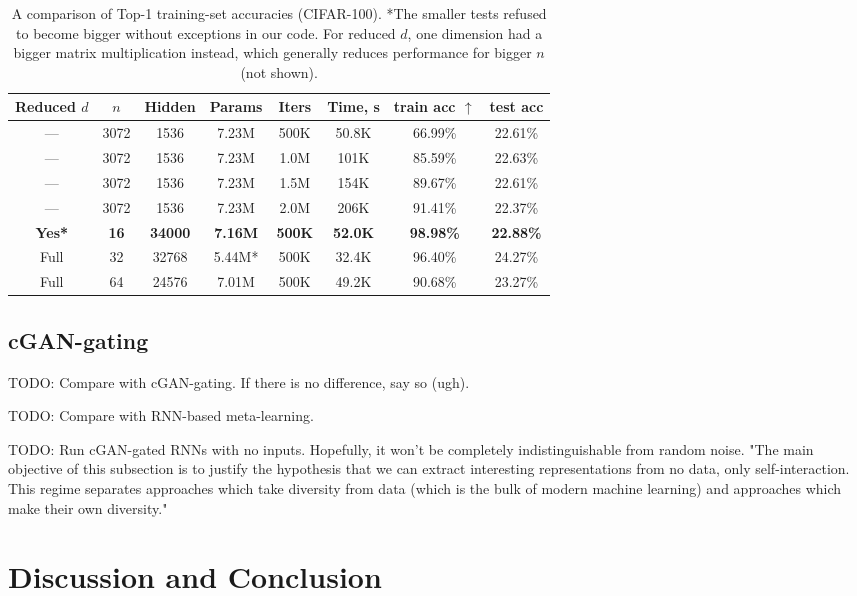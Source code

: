 \documentclass{article}
\begin{document}
\begin{table}
\begin{center}
\begin{tabular}{cccccccc}
\hline
Reduced $d$ & $n$ & Hidden & Params & Iters & Time, s & train acc $\uparrow$ & test acc \\
\hline
--- & 3072 & 1536 & 7.23M & 500K & 50.8K & 66.99\% & 22.61\% \\
--- & 3072 & 1536 & 7.23M & 1.0M & 101K & 85.59\% & 22.63\% \\
--- & 3072 & 1536 & 7.23M & 1.5M & 154K & 89.67\% & 22.61\% \\
--- & 3072 & 1536 & 7.23M & 2.0M & 206K & 91.41\% & 22.37\% \\
\hline
\textbf{Yes*} & \textbf{16} & \textbf{34000} & \textbf{7.16M} & \textbf{500K} & \textbf{52.0K} & \textbf{98.98\%} & \textbf{22.88\%} \\
Full & 32 & 32768 & 5.44M* & 500K & 32.4K & 96.40\% & 24.27\% \\
Full & 64 & 24576 & 7.01M & 500K & 49.2K & 90.68\% & 23.27\% \\
\hline
\end{tabular}
\end{center}
\caption{A comparison of Top-1 training-set accuracies (CIFAR-100). *The smaller tests refused to become bigger without exceptions in our code. For reduced $d$, one dimension had a bigger matrix multiplication instead, which generally reduces performance for bigger $n$ (not shown).}
\label{LDLimages}
\end{table}

\subsection{cGAN-gating}

    TODO: Compare with cGAN-gating. If there is no difference, say so (ugh).

    TODO: Compare with RNN-based meta-learning.

    TODO: Run cGAN-gated RNNs with no inputs. Hopefully, it won't be completely indistinguishable from random noise. "The main objective of this subsection is to justify the hypothesis that we can extract interesting representations from no data, only self-interaction. This regime separates approaches which take diversity from data (which is the bulk of modern machine learning) and approaches which make their own diversity."

\section{Discussion and Conclusion}
\end{document}
